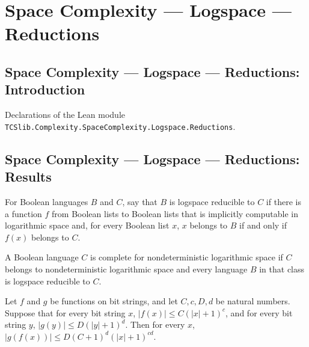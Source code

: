 \section{Space Complexity --- Logspace --- Reductions}
\subsection*{Space Complexity --- Logspace --- Reductions: Introduction}

Declarations of the Lean module \texttt{TCSlib.Complexity.SpaceComplexity.Logspace.Reductions}.

\subsection*{Space Complexity --- Logspace --- Reductions: Results}

\begin{definition}
\label{Complexity.LogspaceReducible}
\leanok
{}
For Boolean languages $B$ and $C$, say that $B$ is logspace reducible to $C$ if there is
a function $f$ from Boolean lists to Boolean lists that is implicitly computable in
logarithmic space and, for every Boolean list $x$, $x$ belongs to $B$ if and only if
$f(x)$ belongs to $C$.
\end{definition}

\begin{definition}
\label{Complexity.NLComplete}
\leanok
{}
A Boolean language $C$ is complete for nondeterministic logarithmic space if $C$ belongs
to nondeterministic logarithmic space and every language $B$ in that class is logspace
reducible to $C$.
\end{definition}

\begin{theorem}
\label{Complexity.comp_length_le}
\leanok
{}
Let $f$ and $g$ be functions on bit strings, and let $C,c,D,d$ be natural numbers.
Suppose that for every bit string $x$, $|f(x)|\le C(|x|+1)^c$, and for every bit string
$y$, $|g(y)|\le D(|y|+1)^d$. Then for every $x$, $|g(f(x))|\le D(C+1)^d(|x|+1)^{cd}$.
\end{theorem}

